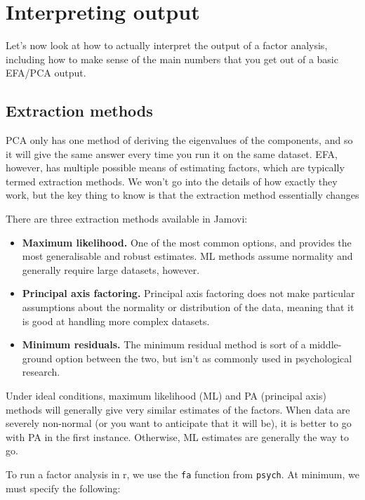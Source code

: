 \documentclass[
]{book}
\providecommand{\tightlist}{%
  \setlength{\itemsep}{0pt}\setlength{\parskip}{0pt}}
\begin{document}
\hypertarget{interpreting-output}{%
\section{Interpreting output}\label{interpreting-output}}

Let's now look at how to actually interpret the output of a factor analysis, including how to make sense of the main numbers that you get out of a basic EFA/PCA output.

\hypertarget{extraction-methods}{%
\subsection{Extraction methods}\label{extraction-methods}}

PCA only has one method of deriving the eigenvalues of the components, and so it will give the same answer every time you run it on the same dataset. EFA, however, has multiple possible means of estimating factors, which are typically termed extraction methods. We won't go into the details of how exactly they work, but the key thing to know is that the extraction method essentially changes

There are three extraction methods available in Jamovi:

\begin{itemize}
\tightlist
\item
  \textbf{Maximum likelihood.} One of the most common options, and provides the most generalisable and robust estimates. ML methods assume normality and generally require large datasets, however.
\item
  \textbf{Principal axis factoring.} Principal axis factoring does not make particular assumptions about the normality or distribution of the data, meaning that it is good at handling more complex datasets.
\item
  \textbf{Minimum residuals.} The minimum residual method is sort of a middle-ground option between the two, but isn't as commonly used in psychological research.
\end{itemize}

Under ideal conditions, maximum likelihood (ML) and PA (principal axis) methods will generally give very similar estimates of the factors. When data are severely non-normal (or you want to anticipate that it will be), it is better to go with PA in the first instance. Otherwise, ML estimates are generally the way to go.

To run a factor analysis in r, we use the \texttt{fa} function from \texttt{psych}. At minimum, we must specify the following:
\end{document}
